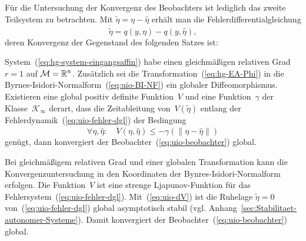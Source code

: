 Für die Untersuchung der Konvergenz des Beobachters ist lediglich
das zweite Teilsystem zu betrachten. Mit $\tilde{\eta}=\eta-\hat{\eta}$
erhält man die Fehlerdifferentialgleichung
\begin{equation}
\dot{\tilde{\eta}}=q(y,\eta)-q(y,\hat{\eta}),\label{eq:uio-fehler-dgl}
\end{equation}
deren Konvergenz der Gegenstand des folgenden Satzes ist:
\begin{theorem}
\label{thm:uio-konvergenz-global}System~(\ref{eq:hg-system-eingangsaffin})
habe einen gleichmäßigen relativen Grad $r=1$ auf $\mathcal{M}={\mathbb{R}}^{n}$.
Zusätzlich sei die Transformation~(\ref{eq:hg-EA-Phi}) in die Byrnes-Isidori-Normalform~(\ref{eq:uio-BI-NF})
ein globaler Diffeomorphismus. Existieren eine global positiv definite
Funktion~$V$ und eine Funktion~$\gamma$ der Klasse~$\mathcal{K}_{\infty}$
derart, dass die Zeit\-ableitung von~$V(\tilde{\eta})$ entlang
der Fehlerdynamik~(\ref{eq:uio-fehler-dgl}) der Bedingung 
\begin{equation}
\forall\eta,\hat{\eta}:\quad\dot{V}(\eta,\hat{\eta})\leq-\gamma(\|\eta-\hat{\eta}\|)\label{eq:uio-dV}
\end{equation}
genügt, dann konvergiert der Beobachter~(\ref{eq:uio-beobachter})
global.
\end{theorem}
\begin{svmultproof2}
Bei gleichmäßigem relativen Grad und einer globalen Transformation
kann die Konvergenzuntersuchung in den Koordinaten der Bynres-Isidori-Normalform
erfolgen. Die Funktion~$V$ ist eine strenge Ljapunov-Funktion für
das Fehlersystem~(\ref{eq:uio-fehler-dgl}). Mit~(\ref{eq:uio-dV})
ist die Ruhelage $\tilde{\eta}=0$ von~(\ref{eq:uio-fehler-dgl})
global asymptotisch stabil (vgl. Anhang~\ref{sec:Stabilitaet-autonomer-Systeme}).
Damit konvergiert der Beobachter~(\ref{eq:uio-beobachter}) global.
\end{svmultproof2}

